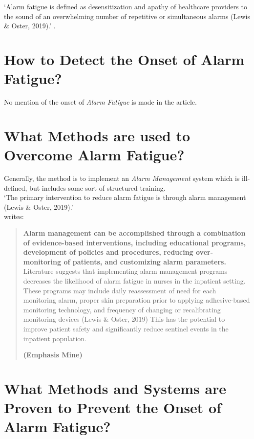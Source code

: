 `Alarm fatigue is deﬁned as desensitization and apathy of
healthcare providers to the sound of an overwhelming
number of repetitive or simultaneous alarms (Lewis \&
Oster, 2019).' \citep[p.2]{dee2022determining}. \\

\section{How to Detect the Onset of Alarm Fatigue?}

No mention of the onset of \textit{Alarm Fatigue} is made in the article.

\section{What Methods are used to Overcome Alarm Fatigue?}

Generally, the method is to implement an \textit{Alarm Management} system which is ill-defined, but includes some sort of structured training. \\

`The primary intervention to reduce alarm
fatigue is through alarm management (Lewis \& Oster,
2019).' \citep[p.2]{dee2022determining} \\

\citet[p.2]{dee2022determining} writes:

\begin{quotation}
	\textbf{Alarm management can be accomplished through a combination of evidence-based interventions, including educational programs, development of policies and procedures,
		reducing over-monitoring of patients, and customizing
		alarm parameters.} Literature suggests that implementing alarm
	management programs decreases the likelihood of alarm
	fatigue in nurses in the inpatient setting. These programs may
	include daily reassessment of need for each monitoring alarm,
	proper skin preparation prior to applying adhesive-based monitoring technology, and frequency of changing or recalibrating
	monitoring devices (Lewis \& Oster, 2019) This has the potential
	to improve patient safety and signiﬁcantly reduce sentinel
	events in the inpatient population.
	\begin{flushright}
		\textbf{(Emphasis Mine)}
	\end{flushright}
\end{quotation}

\section{What Methods and Systems are Proven to Prevent the Onset of Alarm Fatigue?}

